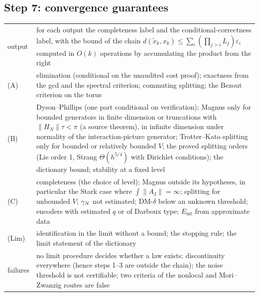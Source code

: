 \subsection*{Step 7: convergence guarantees}
\begin{tabular}{@{}p{2.2cm}p{9.6cm}@{}}
\toprule
output & for each output the completeness label and the conditional-correctness label, with the bound of the chain $d(\tilde x_k,x_k)\le\sum_i(\prod_{j>i}L_j)\varepsilon_i$ computed in $O(k)$ operations by accumulating the product from the right\\
(A) & elimination (conditional on the unaudited cost proof); exactness from the gcd and the spectral criterion; commuting splitting; the Bezout criterion on the torus\\
(B) & Dyson--Phillips (one part conditional on verification); Magnus only for bounded generators in finite dimension or truncations with $\lVert H_N\rVert\tau<\pi$ (a source theorem), in infinite dimension under normality of the interaction-picture generator; Trotter--Kato splitting only for bounded or relatively bounded $V$; the proved splitting orders (Lie order 1, Strang $\Theta(h^{5/4})$ with Dirichlet conditions); the dictionary bound; stability at a fixed level\\
(C) & completeness (the choice of level); Magnus outside its hypotheses, in particular the Stark case where $\int\lVert A_I\rVert=\infty$; splitting for unbounded $V$; $\gamma_{N}$ not estimated; DM-$\delta$ below an unknown threshold; encoders with estimated $q$ or of Darboux type; $E_{\mathrm{int}}$ from approximate data\\
(Lim) & identification in the limit without a bound; the stopping rule; the limit statement of the dictionary\\
failures & no limit procedure decides whether a law exists; discontinuity everywhere (hence steps 1--3 are outside the chain); the noise threshold is not certifiable; two criteria of the nonlocal and Mori--Zwanzig routes are false\\
\bottomrule
\end{tabular}

